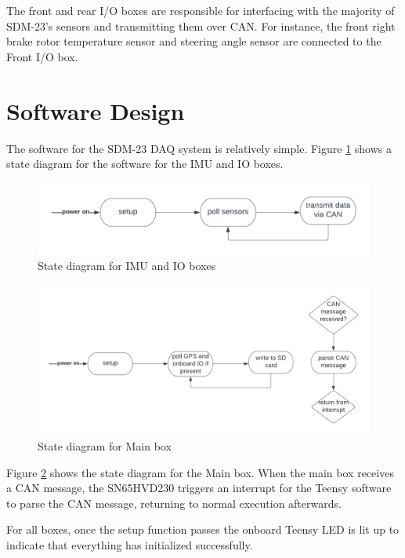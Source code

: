 The front and rear I/O boxes are responsible for interfacing with the majority of SDM-23's sensors and transmitting them over CAN.
For instance, the front right brake rotor temperature sensor and steering angle sensor are connected to the Front I/O box.

\section{Software Design}
The software for the SDM-23 DAQ system is relatively simple.
Figure \ref{fig:sdmioafsdasfs} shows a state diagram for the software for the IMU and IO boxes.
\begin{figure}[H]
    \centering
    \includegraphics[width=7in]{images/sdm23software(1).png}
    \caption{State diagram for IMU and IO boxes}
    \label{fig:sdmioafsdasfs}
\end{figure}
\begin{figure}[H]
    \centering
    \includegraphics[width=7.5in]{images/ffff.png}
    \caption{State diagram for Main box}
    \label{fig:asdfasdfasdf}
\end{figure}
Figure \ref{fig:asdfasdfasdf} shows the state diagram for the Main box.
When the main box receives a CAN message, the SN65HVD230 triggers an interrupt for the Teensy software to parse the CAN message, returning to normal execution afterwards.
\vspace{1em}

For all boxes, once the setup function passes the onboard Teensy LED is lit up to indicate that everything has initialized successfully.

